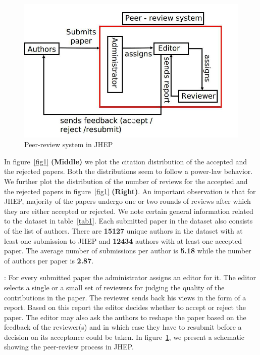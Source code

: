 \begin{figure}
\centering
\includegraphics[scale=0.3]{./texfiles/Chapter_4/jcdl/figures/peer_review.jpg}
\caption{\label{peer_review} Peer-review system in JHEP}
\vspace{3mm}
\end{figure}
In figure~\ref{fig1} {\bf(Middle)} we plot the citation distribution of the accepted and the rejected papers. Both the distributions seem to follow a power-law behavior. We further plot 
the distribution of the number of reviews for the accepted and the rejected papers in figure~\ref{fig1} {\bf(Right)}. An important observation is that for JHEP, majority of the 
papers undergo one or two rounds of reviews after which they are either accepted or rejected. 
We note certain general information related to the dataset in table~\ref{tab1}.
Each submitted paper in the dataset also consists of the list of authors. There are {\bf 15127} unique authors in the dataset with at least one submission to JHEP and {\bf 12434} authors with at least one accepted paper. The average number of submissions per author is {\bf 5.18} while the number of authors per paper is {\bf 2.87}. 

: For every submitted paper the administrator assigns an editor for it. The editor selects a single or a small set of reviewers for judging the quality of the contributions in the paper. The reviewer sends back his views in the form of a report. Based on this report the editor decides whether to accept or reject the paper. The editor may also ask the authors to reshape the paper based on the feedback of the reviewer(s) and in which case they have to resubmit before a decision on its acceptance could be taken. In figure~\ref{peer_review}, we present a schematic showing the peer-review process in JHEP.

\medskip